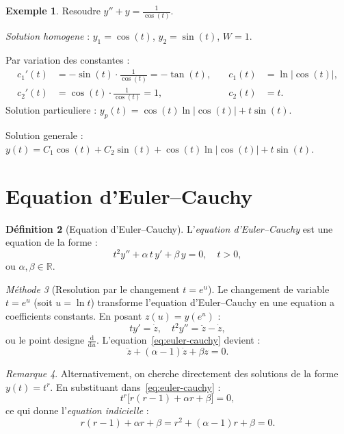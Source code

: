 \documentclass[12pt,a4paper,openany]{book}
\theoremstyle{definition}
\newtheorem{definition}{Définition}[chapter]
\newtheorem{exemple}[definition]{Exemple}
\theoremstyle{plain}
\theoremstyle{remark}
\newtheorem{remarque}[definition]{Remarque}
\newtheorem{methode}[definition]{Méthode}
\newcommand{\R}{\mathbb{R}}
\newcommand{\dd}{\mathrm{d}}
\newcommand{\abs}[1]{\left|#1\right|}
\begin{document}
\begin{exemple}\label{ex:vc}
Resoudre $y'' + y = \frac{1}{\cos(t)}$.

\emph{Solution homogene} : $y_1 = \cos(t)$, $y_2 = \sin(t)$, $W = 1$.

Par variation des constantes :
\begin{align*}
c_1'(t) &= -\sin(t) \cdot \frac{1}{\cos(t)} = -\tan(t), &\quad c_1(t) &= \ln\abs{\cos(t)}, \\
c_2'(t) &= \cos(t) \cdot \frac{1}{\cos(t)} = 1, &\quad c_2(t) &= t.
\end{align*}
Solution particuliere : $y_p(t) = \cos(t)\ln\abs{\cos(t)} + t\sin(t)$.

Solution generale : $y(t) = C_1\cos(t) + C_2\sin(t) + \cos(t)\ln\abs{\cos(t)} + t\sin(t)$.
\end{exemple}

\section{Equation d'Euler--Cauchy}\label{sec:euler-cauchy}

\begin{definition}[Equation d'Euler--Cauchy]\label{def:euler-cauchy}
L'\emph{equation d'Euler--Cauchy} est une equation de la forme :
\begin{equation}\label{eq:euler-cauchy}
  t^2 y'' + \alpha\, t\, y' + \beta\, y = 0, \quad t > 0,
\end{equation}
ou $\alpha, \beta \in \R$.
\end{definition}

\begin{methode}[Resolution par le changement $t = e^u$]\label{meth:euler-cauchy}
Le changement de variable $t = e^u$ (soit $u = \ln t$) transforme l'equation d'Euler--Cauchy en une equation a coefficients constants. En posant $z(u) = y(e^u)$ :
\[
  ty' = \dot{z}, \quad t^2 y'' = \ddot{z} - \dot{z},
\]
ou le point designe $\frac{\dd}{\dd u}$. L'equation~\eqref{eq:euler-cauchy} devient :
\begin{equation}\label{eq:euler-cauchy-transformee}
  \ddot{z} + (\alpha - 1)\dot{z} + \beta z = 0.
\end{equation}
\end{methode}

\begin{remarque}\label{rem:euler-puissance}
Alternativement, on cherche directement des solutions de la forme $y(t) = t^r$. En substituant dans~\eqref{eq:euler-cauchy} :
\[
  t^r\bigl[r(r-1) + \alpha r + \beta\bigr] = 0,
\]
ce qui donne l'\emph{equation indicielle} :
\begin{equation}\label{eq:indicielle}
  r(r-1) + \alpha r + \beta = r^2 + (\alpha - 1)r + \beta = 0.
\end{equation}
\end{remarque}
\end{document}
